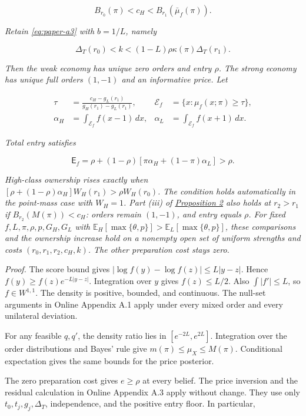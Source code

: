 \[
B_{r_0}(\pi)<c_H<B_{r_1}(\bar\mu_f(\pi)).
\]

\emph{Retain \eqref{eq:paper-a3} with \(b=1/L\), namely}

\[
\Delta_T(r_0)<k<(1-L)\rho\kappa(\pi)\Delta_T(r_1).
\]

\emph{Then the weak economy has unique zero orders and entry \(\rho\).
The strong economy has unique full orders \((1,-1)\) and an informative price.
Let}

\[
\begin{aligned}
\tau&=\frac{c_H-g_L(r_1)}{g_H(r_1)-g_L(r_1)},
&\mathcal E_f&=\{x:\mu_f(x;\pi)\ge\tau\},\\
\alpha_H&=\int_{\mathcal E_f}f(x-1)\,dx,
&\alpha_L&=\int_{\mathcal E_f}f(x+1)\,dx.
\end{aligned}
\]

\emph{Total entry satisfies}

\[
\mathsf E_f=\rho+(1-\rho)[\pi\alpha_H+(1-\pi)\alpha_L]>\rho.
\]

\emph{High-class ownership rises exactly when
\([\rho+(1-\rho)\alpha_H]W_H(r_1)>\rho W_H(r_0)\).
The condition holds automatically in the point-mass case with \(W_H=1\).
Part (iii) of \hyperref[result-proposition-2]{Proposition 2} also holds at
\(r_2>r_1\) if \(B_{r_2}(M(\pi))<c_H\): orders remain \((1,-1)\), and entry equals \(\rho\).
For fixed \(f,L,\pi,\rho,p,G_H,G_L\) with
\(\mathbb E_H[\max\{\theta,p\}]>\mathbb E_L[\max\{\theta,p\}]\),
these comparisons and the ownership increase hold on a nonempty open set
of uniform strengths and costs \((r_0,r_1,r_2,c_H,k)\).
The other preparation cost stays zero.}

\emph{Proof.}
The score bound gives
\(|\log f(y)-\log f(z)|\le L|y-z|\).
Hence \(f(y)\ge f(z)e^{-L|y-z|}\).
Integration over \(y\) gives \(f(z)\le L/2\).
Also \(\int|f'|\le L\), so \(f\in W^{1,1}\).
The density is positive, bounded, and continuous.
The null-set arguments in Online Appendix A.1 apply under every mixed order and every unilateral deviation.
\par
For any feasible \(q,q'\), the density ratio lies in \([e^{-2L},e^{2L}]\).
Integration over the order distributions and Bayes' rule give
\(m(\pi)\le\mu_X\le M(\pi)\).
Conditional expectation gives the same bounds for the price posterior.

The zero preparation cost gives \(e\ge\rho\) at every belief.
The price inversion and the residual calculation in Online Appendix A.3 apply without change.
They use only \(t_0,t_j,g_j,\Delta_T\), independence, and the positive entry floor.
In particular,

